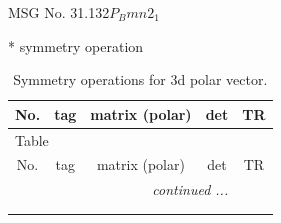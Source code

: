 \documentclass[fleqn,8pt]{jsarticle}
\begin{document}
\setcounter{MaxMatrixCols}{32}

\renewcommand{\tablename}{Table~}
\renewcommand{\figurename}{Figure~}
\begin{center}
\LARGE
MSG No. 31.132\quad$P_{B}mn2_{1}$
\end{center}
* symmetry operation
\renewcommand{\arraystretch}{1.3}
\begin{longtable}{ccccc}
\caption{Symmetry operations for 3d polar vector.}
 \\
 \hline \hline
No. & tag & matrix (polar) & det & TR \\ \hline \endfirsthead

\multicolumn{4}{l}{\tablename\ \thetable{}} \\
 \hline \hline
No. & tag & matrix (polar) & det & TR \\ \hline \endhead

 \hline \hline
\multicolumn{4}{r}{\footnotesize\it continued ...} \\ \endfoot

 \hline \hline
\multicolumn{4}{r}{} \\ \endlastfoot


\end{longtable}
\end{document}
